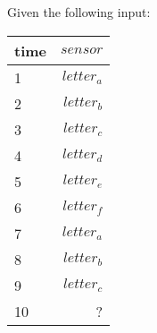 
Given the following input:
\begin{table}[ht!]
\begin{center}
\begin{tabular}{|l|r|}
\hline
time & $\mathit{sensor}$\\
\hline
1 & $\mathit{letter}_a$ \\
2 & $\mathit{letter}_b$ \\
3 & $\mathit{letter}_c$ \\
4 & $\mathit{letter}_d$ \\
5 & $\mathit{letter}_e$ \\
6 & $\mathit{letter}_f$ \\
7 & $\mathit{letter}_a$ \\
8 & $\mathit{letter}_b$ \\
9 & $\mathit{letter}_c$ \\
10 & ? \\
\hline
\end{tabular}
\end{center}
\end{table}

